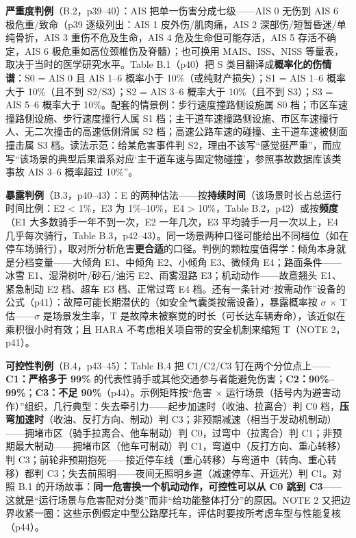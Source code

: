 \textbf{严重度判例}（B.2，p39–40）：AIS 把单一伤害分成七级——AIS 0 无伤到 AIS 6 极危重/致命（p39 逐级列出：AIS 1 皮外伤/肌肉痛，AIS 2 深部伤/短暂昏迷/单纯骨折，AIS 3 重伤不危及生命，AIS 4 危及生命但可能存活，AIS 5 存活不确定，AIS 6 极危重如高位颈椎伤及脊髓）；也可换用 MAIS、ISS、NISS 等量表，取决于当时的医学研究水平。Table B.1（p40）把 S 类目翻译成\textbf{概率化的伤情谱}：S0 = AIS 0 且 AIS 1–6 概率小于 10\%（或纯财产损失）；S1 = AIS 1–6 概率大于 10\%（且不到 S2/S3）；S2 = AIS 3–6 概率大于 10\%（且不到 S3）；S3 = AIS 5–6 概率大于 10\%。配套的情景例：步行速度撞路侧设施属 S0 档；市区车速撞路侧设施、步行速度撞行人属 S1 档；主干道车速撞路侧设施、市区车速撞行人、无二次撞击的高速低侧滑属 S2 档；高速公路车速的碰撞、主干道车速被侧面撞击属 S3 档。读法示范：给某危害事件判 S2，理由不该写“感觉挺严重”，而应写“该场景的典型后果谱系对应‘主干道车速与固定物碰撞’，参照事故数据库该类事故 AIS 3–6 概率超过 10\%”。

\textbf{暴露判例}（B.3，p40–43）：E 的两种估法——按\textbf{持续时间}（该场景时长占总运行时间比例：E2 < 1\%，E3 为 1\%–10\%，E4 > 10\%，Table B.2，p42）或按\textbf{频度}（E1 大多数骑手一年不到一次，E2 一年几次，E3 平均骑手一月一次以上，E4 几乎每次骑行，Table B.3，p42–43）。同一场景两种口径可能给出不同档位（如在停车场骑行），取对所分析危害\textbf{更合适}的口径。判例的颗粒度值得学：倾角本身就是分档变量——大倾角 E1、中倾角 E2、小倾角 E3、微倾角 E4；路面条件——冰雪 E1、湿滑树叶/砂石/油污 E2、雨雾湿路 E3；机动动作——故意翘头 E1、紧急制动 E2 档、超车 E3 档、正常过弯 E4 档。还有一条针对“按需动作”设备的公式（p41）：故障可能长期潜伏的（如安全气囊类按需设备），暴露概率按 \(\sigma\) \(\times\) T 估——\(\sigma\) 是场景发生率，T 是故障未被察觉的时长（可长达车辆寿命），该近似在乘积很小时有效；且 HARA 不考虑相关项自带的安全机制来缩短 T（NOTE 2，p41）。

\textbf{可控性判例}（B.4，p43–45）：Table B.4 把 C1/C2/C3 钉在两个分位点上——\textbf{C1：严格多于 99\%} 的代表性骑手或其他交通参与者能避免伤害；\textbf{C2：90\%–99\%}；\textbf{C3：不足 90\%}（p44）。示例矩阵按“危害 \(\times\) 运行场景（括号内为避害动作）”组织，几行典型：失去牵引力——起步加速时（收油、拉离合）判 C0 档，\textbf{压弯加速时}（收油、反打方向、制动）判 C3；非预期减速（相当于发动机制动）——拥堵市区（骑手拉离合、他车制动）判 C0，过弯中（拉离合）判 C1；非预期最大制动——拥堵市区（他车可制动）判 C1，弯道中（反打方向、重心转移）判 C3；前轮非预期抱死——接近停车线（重心转移）与弯道中（转向、重心转移）都判 C3；失去前照明——夜间无照明乡道（减速停车、开远光）判 C1。对照 B.1 的开场故事：\textbf{同一危害换一个机动动作，可控性可以从 C0 跳到 C3}——这就是“运行场景与危害配对分类”而非“给功能整体打分”的原因。NOTE 2 又把边界收紧一圈：这些示例假定中型公路摩托车，评估时要按所考虑车型与性能复核（p44）。

